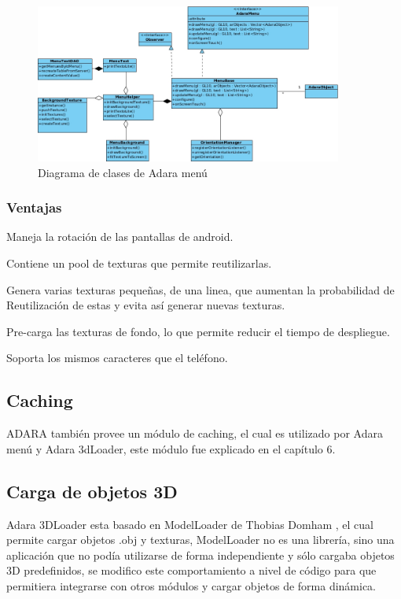 \documentclass[12pt,a4paper,spanish,openany]{book}
\begin{document}
\begin{figure}[ht]
\begin{center}
 \includegraphics[width=0.9\textwidth]{./img/menuClases.jpg}
\caption{Diagrama de clases de Adara menú}
\end{center}
\end{figure}


\subsubsection{Ventajas}

Maneja la rotación de las pantallas de android.

Contiene un pool de texturas que permite reutilizarlas.

Genera varias texturas pequeñas, de una linea, que aumentan la probabilidad de
Reutilización de estas y evita así generar nuevas texturas.

Pre-carga las texturas de fondo, lo que permite reducir el tiempo de despliegue. 

Soporta los mismos caracteres que el teléfono.



\subsection{Caching}
ADARA también provee un módulo de caching, el cual es utilizado por Adara
menú y Adara 3dLoader, este módulo fue explicado en el capítulo 6.


\subsection{Carga de objetos 3D}
Adara 3DLoader esta basado en ModelLoader de Thobias Domham \cite{aroasf}, el
cual permite cargar objetos .obj y texturas,  ModelLoader no es una librería,
sino una aplicación que no podía utilizarse de forma independiente y sólo
cargaba objetos 3D predefinidos, se modifico este comportamiento a nivel de
código para que permitiera integrarse con otros módulos y cargar objetos de
forma dinámica.
\end{document}
